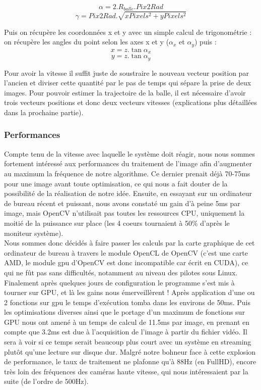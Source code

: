 $$ \alpha = 2.R_{balle}.Pix2Rad $$ 
$$ \gamma = Pix2Rad.\sqrt{xPixels^2 + yPixels^2} $$

Puis on récupère les coordonnées x et y avec un simple calcul de trigonométrie : on récupère les angles du point selon les axes x et y ($\alpha _x$ et $\alpha _y$) puis :
$$ x = z.\tan \alpha _x $$
$$ y = z.\tan \alpha _y $$


Pour avoir la vitesse il suffit juste de soustraire le nouveau vecteur position par l'ancien et diviser cette quantité par le pas de temps qui sépare la prise de deux images. Pour pouvoir estimer la trajectoire de la balle, il est nécessaire d'avoir trois vecteurs positions et donc deux vecteurs vitesses (explications plus détaillées dans la prochaine partie). 


\subsubsection{Performances}

Compte tenu de la vitesse avec laquelle le système doit réagir, nous nous sommes fortement intéressé aux performances du traitement de l'image afin d'augmenter au maximum la fréquence de notre algorithme. Ce dernier prenait déjà 70-75ms pour une image avant toute optimisation, ce qui nous a fait douter de la possibilité de la réalisation de notre idée. Ensuite, en essayant sur un ordinateur de bureau récent et puissant, nous avons constaté un gain d'à peine 5ms par image, mais OpenCV n'utilisait pas toutes les ressources CPU, uniquement la moitié de la puissance sur place (les 4 coeurs tournaient à 50\% d'après le moniteur système). \\

Nous sommes donc décidés à faire passer les calculs par la carte graphique de cet ordinateur de bureau à travers le module OpenCL de OpenCV (c'est une carte AMD, le module gpu d'OpenCV est donc incompatible car écrit en CUDA), ce qui ne fût pas sans difficultés, notamment au niveau des pilotes sous Linux. Finalement après quelques jours de configuration le programme s'est mis à tourner sur GPU, et là les gains nous émerveillèrent ! Après application d'une ou 2 fonctions sur gpu le temps d'exécution tomba dans les environs de 50ms. Puis les optimisations diverses ainsi que le portage d'un maximum de fonctions sur GPU nous ont amené à un temps de calcul de 11.5ms par image, en prenant en compte que 3.2ms est due à l'acquisition de l'image à partir du fichier vidéo. Il sera à voir si ce temps serait beaucoup plus court avec un système en streaming plutôt qu'une lecture sur disque dur. Malgré notre bohneur face à cette explosion de performance, le taux de traitement ne plafonne qu'à 88Hz (en FullHD), encore très loin des fréquences des caméras haute vitesse, qui nous intéressaient par la suite (de l'ordre de 500Hz).\\

